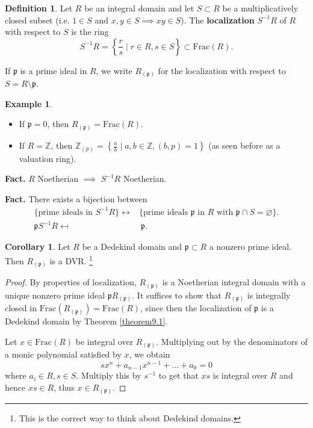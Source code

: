 \documentclass{article}
\theoremstyle{definition}
\newtheorem{cor}[theorem]{Corollary}
\newtheorem{example}{Example}[section]
\newtheorem{defn}{Definition}[section]
\begin{document}
\begin{defn}
    Let $R$ be an integral domain and let $S \subset R$ be a multiplicatively closed subset (i.e. $1 \in S$ and $x,y \in S \implies xy \in S$). The \textbf{localization} $S^{-1}R$ of $R$ with respect to $S$ is the ring \[
S^{-1}R = \left\{\frac{r}{s} \mid r \in R, s \in S\right\} \subset \text{Frac}(R).
\]
\end{defn}
If $\mathfrak{p}$ is a prime ideal in $R$, we write $R_{(\mathfrak{p})}$ for the localization with respect to $S = R \setminus \mathfrak{p}$.
\begin{example}
    \begin{itemize}
        \item If $\mathfrak{p} = 0$, then $R_{(\mathfrak{p})} = \text{Frac}(R)$.
        \item If $R = \mathbb{Z}$, then $\mathbb{Z}_{(p)} = \left\{\frac{a}{b} \mid a, b \in \mathbb{Z}, (b,p)=1\right\}$ (as seen before as a valuation ring).
    \end{itemize}
\end{example}
\textbf{Fact.} $R$ Noetherian $\implies $ $S^{-1}R$ Noetherian.
\vspace{1mm}
 
\textbf{Fact.} There exists a bijection between
\begin{align*}
    \{\text{prime ideals in }S^{-1}R\} \leftrightarrow& \{\text{prime ideals } \mathfrak{p} \text{ in }R\text{ with }\mathfrak{p} \cap S = \varnothing\}.\\
    \mathfrak{p}S^{-1}R \mapsfrom & ~\mathfrak{p}.
\end{align*}
\begin{cor}
    Let $R$ be a Dedekind domain and $\mathfrak{p} \subset R$ a nonzero prime ideal. Then $R_{(\mathfrak{p})}$ is a DVR. \footnote{This is the correct way to think about Dedekind domains.}
\end{cor}
\begin{proof}
    By properties of localization, $R_{(\mathfrak{p})}$ is a Noetherian integral domain with a unique nonzero prime ideal $\mathfrak{p}R_{(\mathfrak{p})}$. It suffices to show that $R_{(\mathfrak{p})}$ is integrally closed in $\text{Frac}(R_{(\mathfrak{p})}) = \text{Frac}(R)$, since then the localization of $\mathfrak{p}$ is a Dedekind domain by Theorem \ref{theorem9.1}. \vspace{1mm}
     
    Let $x \in \text{Frac}(R)$ be integral over $R_{(\mathfrak{p})}$. Multiplying out by the denominators of a monic polynomial satisfied by $x$, we obtain \[
    sx^n + a_{n-1}x^{n-1} + \ldots + a_0  = 0
    \]
    where $a_i \in R, s \in S$. Multiply this by $s^{-1}$ to get that $xs$ is integral over $R$ and hence $xs \in R$, thus $x \in R_{(\mathfrak{p})}$.
\end{proof}
\end{document}
